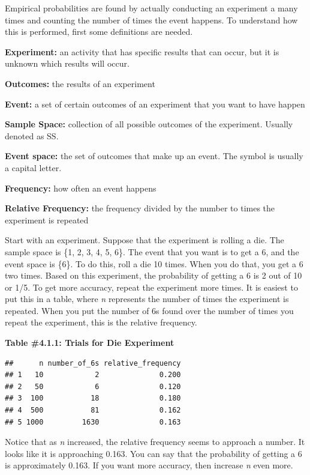 \documentclass[]{book}
\begin{document}
Empirical probabilities are found by actually conducting an experiment a many times and counting the number of times the event happens. To understand how this is performed, first some definitions are needed.

\textbf{Experiment:} an activity that has specific results that can occur, but it is unknown which results will occur.

\textbf{Outcomes:} the results of an experiment

\textbf{Event:} a set of certain outcomes of an experiment that you want to have happen

\textbf{Sample Space:} collection of all possible outcomes of the experiment. Usually denoted as SS.

\textbf{Event space:} the set of outcomes that make up an event. The symbol is usually a capital letter.

\textbf{Frequency:} how often an event happens

\textbf{Relative Frequency:} the frequency divided by the number to times the experiment is repeated

Start with an experiment. Suppose that the experiment is rolling a die. The sample space is \{1, 2, 3, 4, 5, 6\}. The event that you want is to get a 6, and the event space is \{6\}. To do this, roll a die 10 times. When you do that, you get a 6 two times. Based on this experiment, the probability of getting a 6 is 2 out of 10 or 1/5. To get more accuracy, repeat the experiment more times. It is easiest to put this in a table, where \emph{n} represents the number of times the experiment is repeated. When you put the number of 6s found over the number of times you repeat the experiment, this is the relative frequency.

\textbf{Table \#4.1.1: Trials for Die Experiment}

\begin{verbatim}
##      n number_of_6s relative_frequency
## 1   10            2              0.200
## 2   50            6              0.120
## 3  100           18              0.180
## 4  500           81              0.162
## 5 1000         1630              0.163
\end{verbatim}

Notice that as \emph{n} increased, the relative frequency seems to approach a number. It looks like it is approaching 0.163. You can say that the probability of getting a 6 is approximately 0.163. If you want more accuracy, then increase \emph{n} even more.
\end{document}
